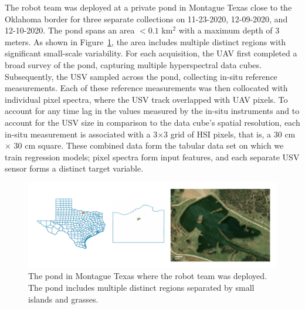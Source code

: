 \documentclass[remotesensing,article,submit,pdftex,moreauthors]{Definitions/mdpi}
\begin{document}
The robot team was deployed at a private pond in Montague Texas close to the Oklahoma border for three separate collections on 11-23-2020, 12-09-2020, and 12-10-2020. The pond spans an area $<0.1$ km$^{2}$ with a maximum depth of 3 meters. As shown in Figure~\ref{fig:study-area}, the area includes multiple distinct regions with significant small-scale variability. For each acquisition, the UAV first completed a broad survey of the pond, capturing multiple hyperspectral data cubes. Subsequently, the USV sampled across the pond, collecting in-situ reference measurements. Each of these reference measurements was then collocated with individual pixel spectra, where the USV track overlapped with UAV pixels. To account for any time lag in the values measured by the in-situ instruments and to account for the USV size in comparison to the data cube's spatial resolution, each in-situ measurement is associated with a 3$\times$3 grid of HSI pixels, that is, a 30 cm $\times$ 30 cm square. These combined data form the tabular data set on which we train regression models; pixel spectra form input features, and each separate USV sensor forms a distinct target variable.

\begin{figure}[t!]
\centering
\includegraphics[width=\columnwidth]{paper/figures/materials-and-methods/study-area.pdf}
\caption{The pond in Montague Texas where the robot team was deployed. The pond includes multiple distinct regions separated by small islands and grasses. \label{fig:study-area}}
\end{figure}  
\end{document}
